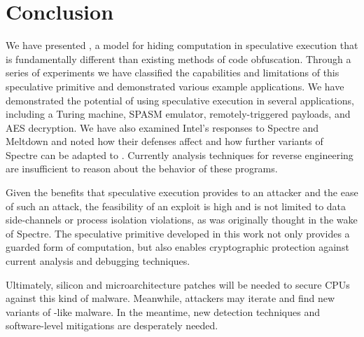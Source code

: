 
\section{Conclusion}

We have presented \speculake, a model for hiding computation in speculative
execution that is fundamentally different than existing methods of code
obfuscation. Through a series of experiments we have classified the capabilities
and limitations of this speculative primitive and demonstrated various example
applications. We have demonstrated the potential of using speculative execution
in several applications, including a Turing machine, SPASM emulator,
remotely-triggered payloads, and AES decryption. We have also examined Intel's
responses to Spectre and Meltdown and noted how their defenses affect \speculake
and how further variants of Spectre can be adapted to \speculake. Currently
analysis techniques for reverse engineering are insufficient to reason about the
behavior of these programs.

Given the benefits that speculative execution provides to an attacker and the
ease of such an attack, the feasibility of an \speculake exploit is high and is
not limited to data side-channels or process isolation violations, as was
originally thought in the wake of Spectre. The speculative primitive developed
in this work not only provides a guarded form of computation, but also enables
cryptographic protection against current analysis and debugging techniques.

Ultimately, silicon and microarchitecture patches will be needed to secure CPUs
against this kind of malware. Meanwhile, attackers may
iterate and find new variants of \speculake-like malware.
In the meantime, new detection techniques and
software-level mitigations are desperately needed.

%
